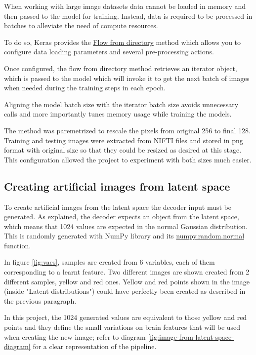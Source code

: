 When working with large image datasets data cannot be loaded in memory and then passed to the model for training. Instead, data is required to be processed in batches to alleviate the need of compute resources.

To do so, Keras provides the \href{https://www.tensorflow.org/api_docs/python/tf/keras/preprocessing/image/ImageDataGenerator#flow_from_directory}{Flow from directory} method which allows you to configure data loading parameters and several pre-processing actions.

Once configured, the flow from directory method retrieves an iterator object, which is passed to the model which will invoke it to get the next batch of images when needed during the training steps in each epoch.

Aligning the model batch size with the iterator batch size avoids unnecessary calls and more importantly tunes memory usage while training the models.

The method was paremetrized to rescale the pixels from original 256 to final 128. Training and testing images were extracted from NIFTI files and stored in \acrshort{png} format with original size so that they could be resized as desired at this stage. This configuration allowed the project to experiment with both sizes much easier.

\subsection{Creating artificial images from latent space}
\label{sec:generate-images}
To create artificial images from the latent space the decoder input must be generated. As explained, the decoder expects an object from the latent space, which means that 1024 values are expected in the normal Gaussian distribution. This is randomly generated with NumPy library and its \href{https://numpy.org/doc/stable/reference/random/generated/numpy.random.normal.html}{numpy.random.normal} function.

In figure \ref{fig:vaes}, samples are created from 6 variables, each of them corresponding to a learnt feature. Two different images are shown created from 2 different samples, yellow and red ones. Yellow and red points shown in the image (inside "Latent distributions") could have perfectly been created as described in the previous paragraph.

In this project, the 1024 generated values are equivalent to those yellow and red points and they define the small variations on brain features that will be used when creating the new image; refer to diagram \ref{fig:image-from-latent-space-diagram} for a clear representation of the pipeline.

